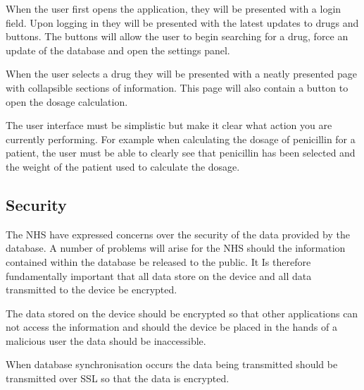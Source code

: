 \documentclass[11pt,fleqn,twoside]{article}
\begin{document}
When the user first opens the application, they will be presented with a login field. Upon logging in they will be presented with the latest updates to drugs and buttons. The buttons will allow the user to begin searching for a drug, force an update of the database and open the settings panel.

When the user selects a drug they will be presented with a neatly presented page with collapsible sections of information. This page will also contain a button to open the dosage calculation.

The user interface must be simplistic but make it clear what action you are currently performing. For example when calculating the dosage of penicillin for a patient, the user must be able to clearly see that penicillin has been selected and the weight of the patient used to calculate the dosage.
\subsection{Security}

The NHS have expressed concerns over the security of the data provided by the database. A number of problems will arise for the NHS should the information contained within the database be released to the public. It Is therefore fundamentally important that all data store on the device and all data transmitted to the device be encrypted.

The data stored on the device should be encrypted so that other applications can not access the information and should the device be placed in the hands of a malicious user the data should be inaccessible.

When database synchronisation occurs the data being transmitted should be transmitted over SSL so that the data is encrypted.


\end{document}
